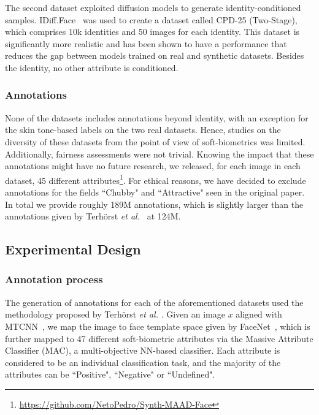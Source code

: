 \documentclass[a4paper, 10pt, conference]{ieeeconf}      %
\begin{document}
The second dataset exploited diffusion models to generate identity-conditioned samples. IDiff.Face~\cite{boutros2023idiff} was used to create a dataset called CPD-25 (Two-Stage), which comprises 10k identities and 50 images for each identity. This dataset is significantly more realistic and has been shown to have a performance that reduces the gap between models trained on real and synthetic datasets. Besides the identity, no other attribute is conditioned. 

\subsubsection{Annotations}

None of the datasets includes annotations beyond identity, with an exception for the skin tone-based labels on the two real datasets. Hence, studies on the diversity of these datasets from the point of view of soft-biometrics was limited. Additionally, fairness assessments were not trivial. Knowing the impact that these annotations might have no future research, we released, for each image in each dataset, 45 different attributes\footnote{\url{https://github.com/NetoPedro/Synth-MAAD-Face}}. For ethical reasons, we have decided to exclude annotations for the fields ``Chubby" and ``Attractive" seen in the original paper. In total we provide roughly 189M annotations, which is slightly larger than the annotations given by Terhörst  \textit{et al.}~\cite{terhorst2021maadface} at 124M.

\subsection{Experimental Design}

\subsubsection{Annotation process}

The generation of annotations for each of the aforementioned datasets used the methodology proposed by Terhörst  \textit{et al.} \cite{terhörst2020beyond, terhorst2021maadface}. Given an image $x$ aligned with MTCNN~\cite{zhang2016joint}, we map the image to face template space given by FaceNet~\cite{schroff2015facenet}, which is further mapped to 47 different soft-biometric attributes via the Massive Attribute Classifier (MAC), a multi-objective NN-based classifier. Each attribute is considered to be an individual classification task, and the majority of the attributes can be ``Positive", ``Negative" or ``Undefined". 
\end{document}
